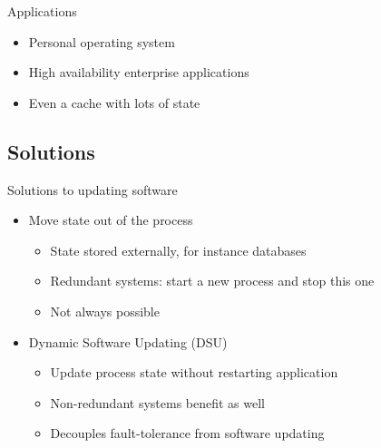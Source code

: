 {
\begin{frame}{Applications}%
\begin{itemize}
\item Personal operating system
\item High availability enterprise applications
\item Even a cache with lots of state
\end{itemize}
\end{frame}
}

\subsection{Solutions}
\begin{frame}{Solutions to updating software}%
\begin{itemize}
\item Move state out of the process
  \begin{itemize}
  \item State stored externally, for instance databases
  \item Redundant systems: start a new process and stop this one
  \item Not always possible
  \end{itemize}
\item<2-> Dynamic Software Updating (DSU)
  \begin{itemize}
    \item Update process state without restarting application
    \item Non-redundant systems benefit as well
    \item Decouples fault-tolerance from software updating
  \end{itemize}
\end{itemize}
\end{frame}


